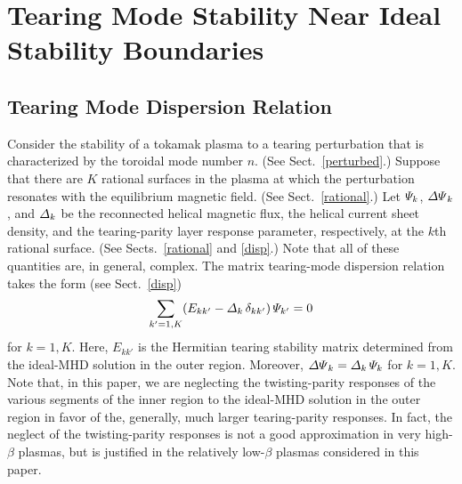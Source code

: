 \documentclass[12pt,prb,aps]{revtex4-1}
\begin{document}
\section{Tearing Mode Stability Near Ideal Stability Boundaries}\label{invest}

\subsection{Tearing Mode Dispersion Relation}
Consider the stability of a tokamak plasma to a tearing perturbation that is characterized by the toroidal mode number $n$. (See Sect.~\ref{perturbed}.)
Suppose that there are $K$ rational surfaces in the plasma at which the perturbation resonates with the equilibrium magnetic field. (See Sect.~\ref{rational}.)
Let ${\mit\Psi}_k$, ${\mit\Delta\Psi}_k$, and ${\mit\Delta}_k$ be the reconnected helical magnetic flux, the helical current sheet density, and the
tearing-parity layer response parameter, respectively, at the $k$th rational surface. (See Sects.~\ref{rational} and \ref{disp}.) Note that all of these
quantities are, in general, complex. The matrix tearing-mode dispersion relation takes the form (see Sect.~\ref{disp}) 
\begin{equation}\label{tmdisp}
\sum_{k'=1,K}(E_{kk'}-{\mit\Delta}_k\,\delta_{kk'})\,{\mit\Psi}_{k'} = 0
\end{equation}
for $k=1,K$. Here, $E_{kk'}$ is the Hermitian tearing stability matrix determined from the ideal-MHD solution in the outer region. 
Moreover, ${\mit\Delta\Psi}_k = {\mit\Delta}_k\,{\mit\Psi}_k$ for $k=1,K$. Note that, in this paper, we are neglecting the twisting-parity responses of the
various segments of the inner region to the ideal-MHD solution in the outer region in favor of the, generally, much larger tearing-parity responses.\cite{am3}
In fact, the neglect of the twisting-parity responses   is not a good approximation in very high-$\beta$ plasmas,\cite{bren2} but is justified in the relatively low-$\beta$
plasmas considered in this paper. 
\end{document}
